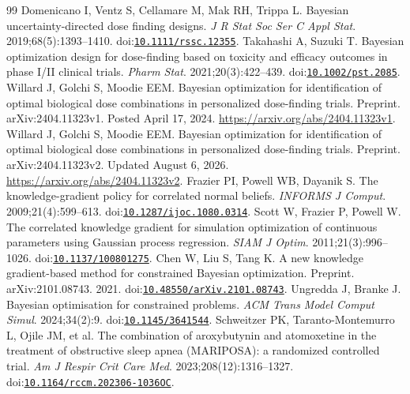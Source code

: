 \documentclass[11pt]{article}
\begin{document}
\begin{thebibliography}{99}
 Domenicano I, Ventz S, Cellamare M, Mak RH, Trippa L. Bayesian uncertainty-directed dose finding designs. \textit{J R Stat Soc Ser C Appl Stat}. 2019;68(5):1393--1410. doi:\href{https://doi.org/10.1111/rssc.12355}{\nolinkurl{10.1111/rssc.12355}}.
 Takahashi A, Suzuki T. Bayesian optimization design for dose-finding based on toxicity and efficacy outcomes in phase I/II clinical trials. \textit{Pharm Stat}. 2021;20(3):422--439. doi:\href{https://doi.org/10.1002/pst.2085}{\nolinkurl{10.1002/pst.2085}}.
 Willard J, Golchi S, Moodie EEM. Bayesian optimization for identification of optimal biological dose combinations in personalized dose-finding trials. Preprint. arXiv:2404.11323v1. Posted April 17, 2024. \url{https://arxiv.org/abs/2404.11323v1}.
 Willard J, Golchi S, Moodie EEM. Bayesian optimization for identification of optimal biological dose combinations in personalized dose-finding trials. Preprint. arXiv:2404.11323v2. Updated August 6, 2026. \url{https://arxiv.org/abs/2404.11323v2}.
 Frazier PI, Powell WB, Dayanik S. The knowledge-gradient policy for correlated normal beliefs. \textit{INFORMS J Comput}. 2009;21(4):599--613. doi:\href{https://doi.org/10.1287/ijoc.1080.0314}{\nolinkurl{10.1287/ijoc.1080.0314}}.
 Scott W, Frazier P, Powell W. The correlated knowledge gradient for simulation optimization of continuous parameters using Gaussian process regression. \textit{SIAM J Optim}. 2011;21(3):996--1026. doi:\href{https://doi.org/10.1137/100801275}{\nolinkurl{10.1137/100801275}}.
 Chen W, Liu S, Tang K. A new knowledge gradient-based method for constrained Bayesian optimization. Preprint. arXiv:2101.08743. 2021. doi:\href{https://doi.org/10.48550/arXiv.2101.08743}{\nolinkurl{10.48550/arXiv.2101.08743}}.
 Ungredda J, Branke J. Bayesian optimisation for constrained problems. \textit{ACM Trans Model Comput Simul}. 2024;34(2):9. doi:\href{https://doi.org/10.1145/3641544}{\nolinkurl{10.1145/3641544}}.
 Schweitzer PK, Taranto-Montemurro L, Ojile JM, et al. The combination of aroxybutynin and atomoxetine in the treatment of obstructive sleep apnea (MARIPOSA): a randomized controlled trial. \textit{Am J Respir Crit Care Med}. 2023;208(12):1316--1327. doi:\href{https://doi.org/10.1164/rccm.202306-1036OC}{\nolinkurl{10.1164/rccm.202306-1036OC}}.

\end{thebibliography}
\end{document}
